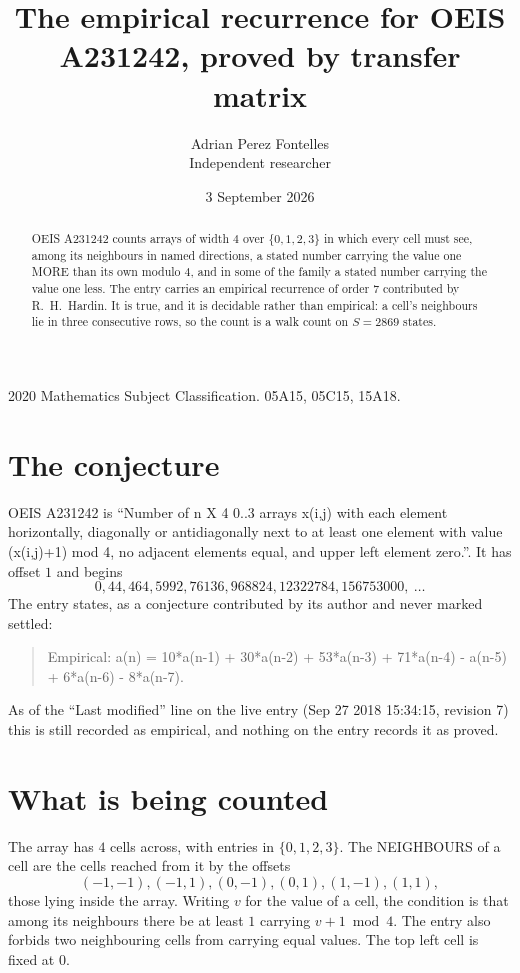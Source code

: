 \documentclass[11pt,a4paper]{article}
\title{The empirical recurrence for OEIS A231242, proved by transfer matrix}
\author{Adrian Perez Fontelles\\ \small Independent researcher}
\date{3 September 2026}
\theoremstyle{plain}
\theoremstyle{definition}
\begin{document}
\maketitle

\begin{abstract}
OEIS A231242 counts arrays of width $4$ over $\{0,1,2,3\}$ in which every cell must see, among its
neighbours in named directions, a stated number carrying the value one MORE than its own
modulo $4$, and in some of the family a stated number carrying the value one less. The entry
carries an empirical recurrence of order $7$ contributed by R.~H.~Hardin. It is true, and
it is decidable rather than empirical: a cell's neighbours lie in three consecutive rows, so
the count is a walk count on $S=2869$ states.
\end{abstract}

\noindent\small 2020 Mathematics Subject Classification. 05A15, 05C15, 15A18.\normalsize

\section{The conjecture}

OEIS A231242 is ``Number of n X 4 0..3 arrays x(i,j) with each element horizontally, diagonally or antidiagonally next to at least one element with value (x(i,j)+1) mod 4, no adjacent elements equal, and upper left element zero.''. It has offset $1$ and begins
\[
0, 44, 464, 5992, 76136, 968824, 12322784, 156753000,\ \dots
\]
The entry states, as a conjecture contributed by its author and never marked settled:
\begin{quote}
Empirical: a(n) = 10*a(n-1) + 30*a(n-2) + 53*a(n-3) + 71*a(n-4) - a(n-5) + 6*a(n-6) - 8*a(n-7).
\end{quote}
As of the ``Last modified'' line on the live entry (Sep 27 2018 15:34:15, revision 7) this is still
recorded as empirical, and nothing on the entry records it as proved.

\section{What is being counted}

The array has $4$ cells across, with entries in $\{0,1,2,3\}$. The NEIGHBOURS of a cell are the
cells reached from it by the offsets
\[
(-1,-1), (-1,1), (0,-1), (0,1), (1,-1), (1,1),
\]
those lying inside the array. Writing $v$ for the value of a cell, the condition is that among
its neighbours there be at least $1$ carrying $v+1 \bmod 4$. The entry also forbids two neighbouring cells from carrying equal values. The top left
cell is fixed at $0$.
\end{document}
